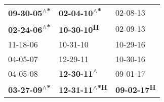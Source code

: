 \begin{supertabular}{lll}
 \textbf{09-30-05\textsuperscript{$\wedge$*}} &   \textbf{02-04-10\textsuperscript{$\wedge$*}} &            02-08-13\textsuperscript{} \\
 \textbf{02-24-06\textsuperscript{$\wedge$*}} &           \textbf{10-30-10\textsuperscript{H}} &            02-09-13\textsuperscript{} \\
                   11-18-06\textsuperscript{} &                     10-31-10\textsuperscript{} &            10-29-16\textsuperscript{} \\
                   04-05-07\textsuperscript{} &                     12-29-11\textsuperscript{} &            10-30-16\textsuperscript{} \\
                   04-05-08\textsuperscript{} &    \textbf{12-30-11\textsuperscript{$\wedge$}} &            09-01-17\textsuperscript{} \\
 \textbf{03-27-09\textsuperscript{$\wedge$*}} &  \textbf{12-31-11\textsuperscript{$\wedge$*H}} &  \textbf{09-02-17\textsuperscript{H}} \\
\end{supertabular}
